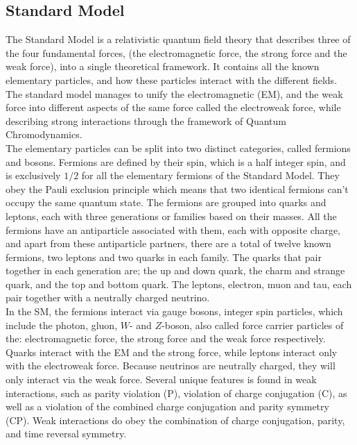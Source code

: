 \documentclass[12pt,a4paper]{article}
\numberwithin{equation}{section}
\begin{document}
\subsection{Standard Model}
The Standard Model is a relativistic quantum field theory that describes three
of the four fundamental forces, (the electromagnetic force, the strong force and
the weak force), into a single theoretical framework. It contains all the known
elementary particles, and how these particles interact with the different
fields. The standard model manages to unify the electromagnetic (EM), and the
weak force into different aspects of the same force called the electroweak
force, while describing strong interactions through the framework of Quantum
Chromodynamics.\\

The elementary particles can be split into two distinct categories, called
fermions and bosons. Fermions are defined by their spin, which is a half integer
spin, and is exclusively $1/2$ for all the elementary fermions of the Standard
Model. They obey the Pauli exclusion principle which means that two identical
fermions can't occupy the same quantum state. The fermions are grouped into
quarks and leptons, each with three generations or families based on their
masses. All the fermions have an antiparticle associated with them, each with
opposite charge, and apart from these antiparticle partners, there are a total
of twelve known fermions, two leptons and two quarks in each family. The quarks
that pair together in each generation are; the up and down quark, the charm and
strange quark, and the top and bottom quark. The leptons, electron, muon and
tau, each pair together with a neutrally charged neutrino.\\


In the SM, the fermions interact via gauge bosons, integer spin particles, which
include the photon, gluon, $W$- and $Z$-boson, also called force carrier
particles of the: electromagnetic force, the strong force and the weak force
respectively. Quarks interact with the EM and the strong force, while leptons
interact only with the electroweak force. Because neutrinos are neutrally
charged, they will only interact via the weak force. Several unique features is
found in weak interactions, such as parity violation (P), violation of charge
conjugation (C), as well as a violation of the combined charge conjugation and
parity symmetry (CP). Weak interactions do obey the combination of charge
conjugation, parity, and time reversal symmetry.
\end{document}
